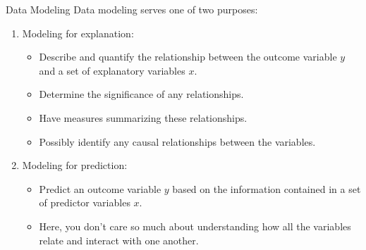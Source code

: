 \documentclass[
  ignorenonframetext,
]{beamer}
\providecommand{\tightlist}{%
  \setlength{\itemsep}{0pt}\setlength{\parskip}{0pt}}
\begin{document}
\begin{frame}{Data Modeling}
\protect{}\label{data-modeling}
Data modeling serves one of two purposes:

\begin{enumerate}
\item
  Modeling for explanation:

  \begin{itemize}
  \tightlist
  \item
    Describe and quantify the relationship between the outcome variable
    \(y\) and a set of explanatory variables \(x\).
  \item
    Determine the significance of any relationships.
  \item
    Have measures summarizing these relationships.
  \item
    Possibly identify any causal relationships between the variables.
  \end{itemize}
\item
  Modeling for prediction:

  \begin{itemize}
  \tightlist
  \item
    Predict an outcome variable \(y\) based on the information contained
    in a set of predictor variables \(x\).
  \item
    Here, you don't care so much about understanding how all the
    variables relate and interact with one another.
  \end{itemize}
\end{enumerate}
\end{frame}
\end{document}

